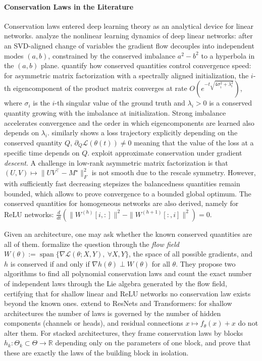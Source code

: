 \documentclass[mathematics,review,submit,moreauthors]{Definitions/mdpi}
\begin{document}
\paragraph{Conservation Laws in the Literature}

Conservation laws entered deep learning theory as an analytical device for linear networks.
\citet{saxe2014piclr2} analyze the nonlinear learning dynamics of deep linear networks: after an SVD-aligned change of variables the gradient flow decouples into independent modes $(a,b)$, constrained by the conserved imbalance $a^2-b^2$ to a hyperbola in the $(a,b)$ plane.
\citet{tarmoun2021p3icml} quantify how conserved quantities control convergence speed: for asymmetric matrix factorization with a spectrally aligned initialization, the $i$-th eigencomponent of the product matrix converges at rate $O(e^{-t\sqrt{4\sigma_i^2+\lambda_i^2}})$, where $\sigma_i$ is the $i$-th singular value of the ground truth and $\lambda_i>0$ is a conserved quantity growing with the imbalance at initialization.
Strong imbalance accelerates convergence and the order in which eigencomponents are learned also depends on $\lambda_i$.
\citet{zhao2023a} similarly shows a loss trajectory explicitly depending on the conserved quantity $Q$, $\partial_Q\mathcal{L}(\theta(t))\neq0$ meaning that the value of the loss at a specific time depends on $Q$.
\citet{du2018anips} exploit approximate conservation under gradient \emph{descent}.
A challenge in low-rank asymmetric matrix factorization is that $(U,V) \mapsto \lVert UV^\top-M^\star\rVert_F^2$ is not smooth due to the rescale symmetry.
However, with sufficiently fast decreasing stepsizes the balancedness quantities remain bounded, which allows to prove convergence to a bounded global optimum.
The conserved quantities for homogeneous networks are also derived, namely for ReLU networks: $\frac{d}{dt} \left( \|W^{(h)}[i, :]\|^2 - \|W^{(h+1)}[:, i]\|^2 \right) = 0$.

Given an architecture, one may ask whether the known conserved quantities are all of them.
\citet{marcotte2023} formalize the question through the \emph{flow field} $W(\theta):=\operatorname{span}\{\nabla\mathcal{L}(\theta;X,Y),\ \forall X,Y\}$, the space of all possible gradients, and $h$ is conserved if and only if $\nabla h(\theta)\perp W(\theta)$ for all $\theta$.
They propose two algorithms to find all polynomial conservation laws and count the exact number of independent laws through the Lie algebra generated by the flow field, certifying that for shallow linear and ReLU networks no conservation law exists beyond the known ones.
\citet{marcotte2025p4icml} extend to ResNets and Transformers: for shallow architectures the number of laws is governed by the number of hidden components (channels or heads), and residual connections $x\mapsto f_\theta(x)+x$ do not alter them.
For stacked architectures, they frame conservation laws by blocks $h_k:\Theta_k\subset\Theta\to\mathbb{R}$ depending only on the parameters of one block, and prove that these are exactly the laws of the building block in isolation.
\end{document}
